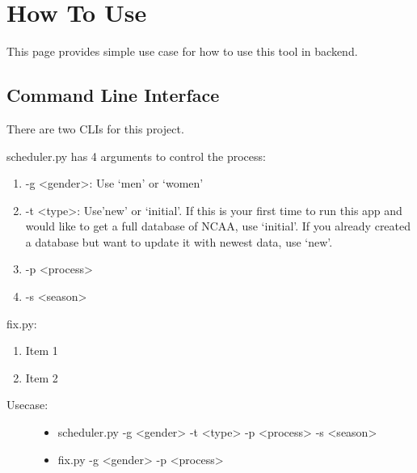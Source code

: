 \documentclass[letterpaper,10pt,english]{sphinxmanual}
\begin{document}
\chapter{How To Use}
\label{_static/howto:how-to-use}\label{_static/howto::doc}
This page provides simple use case for how to use this tool in backend.


\section{Command Line Interface}
\label{_static/howto:command-line-interface}
There are two CLIs for this project.

scheduler.py has 4 arguments to control the process:
\begin{enumerate}
\item {} 
-g \textless{}gender\textgreater{}: Use `men' or `women'

\item {} 
-t \textless{}type\textgreater{}: Use'new' or `initial'. If this is your first time to run this app and would like to get a full database of NCAA, use `initial'. If you already created a database but want to update it with newest data, use `new'.

\item {} 
-p \textless{}process\textgreater{}

\item {} 
-s \textless{}season\textgreater{}

\end{enumerate}

fix.py:
\begin{enumerate}
\item {} 
Item 1

\item {} 
Item 2

\end{enumerate}
\begin{description}
\item[{Usecase:}] \leavevmode\begin{itemize}
\item {} 
scheduler.py -g \textless{}gender\textgreater{} -t \textless{}type\textgreater{} -p \textless{}process\textgreater{} -s \textless{}season\textgreater{}

\item {} 
fix.py -g \textless{}gender\textgreater{} -p \textless{}process\textgreater{}

\end{itemize}

\end{description}
\end{document}
